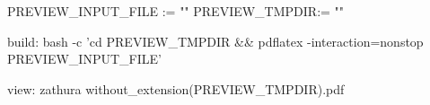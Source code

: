 PREVIEW_INPUT_FILE := ""
PREVIEW_TMPDIR:= ""

build:
  bash -c 'cd {{PREVIEW_TMPDIR}} && pdflatex -interaction=nonstop {{PREVIEW_INPUT_FILE}}'

view:
    zathura {{without_extension(PREVIEW_TMPDIR)}}.pdf

